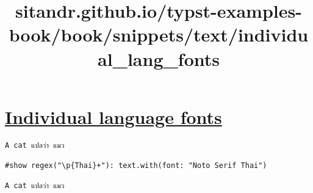 \title{sitandr.github.io/typst-examples-book/book/snippets/text/individual_lang_fonts}

\section{\texorpdfstring{\hyperref[individual-language-fonts]{Individual
language
fonts}}{Individual language fonts}}\label{individual-language-fonts}

\begin{verbatim}
A cat แปลว่า แมว

#show regex("\p{Thai}+"): text.with(font: "Noto Serif Thai")

A cat แปลว่า แมว
\end{verbatim}

\pandocbounded{}
